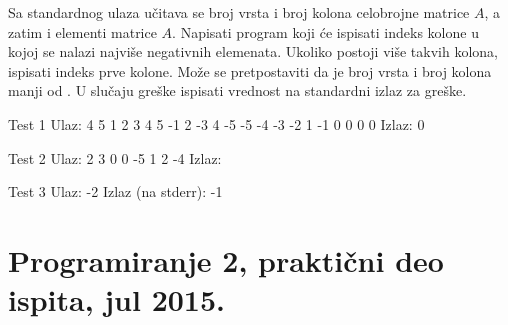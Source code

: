 \begin{Exercise}[label=903]
Sa standardnog ulaza učitava se broj vrsta i broj kolona celobrojne matrice $A$, a zatim i elementi matrice $A$. Napisati program koji će ispisati indeks kolone u kojoj se nalazi najviše negativnih elemenata. Ukoliko postoji više takvih kolona, ispisati indeks prve kolone. Može se pretpostaviti da je broj vrsta i broj kolona manji od . U slučaju greške ispisati vrednost  na standardni izlaz za greške. 

\begin{minitest}
\begin{test}{Test 1}
Ulaz:                         
  4                             
  5                                                               
  1  2  3  4  5               
 -1  2 -3  4 -5                
 -5 -4 -3 -2  1               
 -1  0  0  0  0 
 Izlaz:                         
  0                                                    
\end{test}
\end{minitest}
\begin{minitest}
\begin{test}{Test 2}
Ulaz:                         
 2                               
 3                                 
 0 0 -5
 1 2 -4
Izlaz:   
\end{test}
\end{minitest}
\begin{minitest}
\begin{test}{Test 3}
Ulaz:                         
 -2
Izlaz (na stderr):
 -1
\end{test}
\end{minitest}

\end{Exercise}
\begin{Answer}[ref=903]
\end{Answer}

\section{Programiranje 2, praktični deo ispita, jul 2015.}


